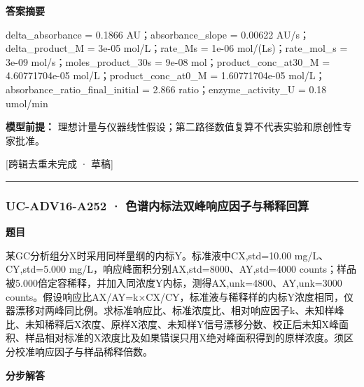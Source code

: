 \documentclass[UTF8,11pt,a4paper]{ctexart}
\begin{document}
\noindent\textbf{答案摘要}\par
delta\_absorbance = 0.1866 AU；absorbance\_slope = 0.00622 AU/s；delta\_product\_M = 3e-05 mol/L；rate\_Ms = 1e-06 mol/(Ls)；rate\_mol\_s = 3e-09 mol/s；moles\_product\_30s = 9e-08 mol；product\_conc\_at30\_M = 4.60771704e-05 mol/L；product\_conc\_at0\_M = 1.60771704e-05 mol/L；absorbance\_ratio\_final\_initial = 2.866 ratio；enzyme\_activity\_U = 0.18 umol/min\par
\noindent\textbf{模型前提：}
理想计量与仪器线性假设；第二路径数值复算不代表实验和原创性专家批准。\par
\noindent\textcolor{red!65!black}{[跨辑去重未完成 · 草稿]} \par
\medskip\hrule\medskip
{}
\subsubsection*{UC-ADV16-A252 · 色谱内标法双峰响应因子与稀释回算}
\noindent\textbf{题目}\par
某GC分析组分X时采用同样量纲的内标Y。标准液中CX,std=10.00 mg/L、CY,std=5.000 mg/L，响应峰面积分别AX,std=8000、AY,std=4000 counts；样品被5.000倍定容稀释，并加入同浓度Y内标，测得AX,unk=4800、AY,unk=3000 counts。假设响应比AX/AY=k×CX/CY，标准液与稀释样的内标Y浓度相同，仪器漂移对两峰同比例。求标准响应比、标准浓度比、相对响应因子k、未知样峰比、未知稀释后X浓度、原样X浓度、未知样Y信号漂移分数、校正后未知X峰面积、样品相对标准的X浓度比及如果错误只用X绝对峰面积得到的原样浓度。须区分校准响应因子与样品稀释倍数。\par
\medskip\noindent\textbf{分步解答}
\end{document}

